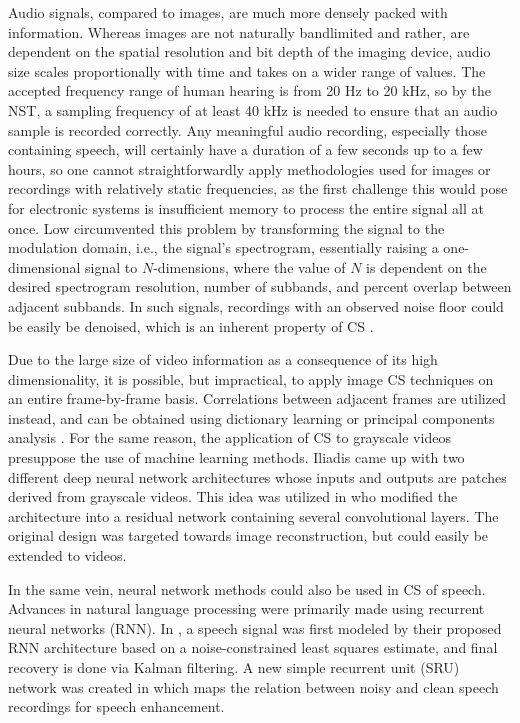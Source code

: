 Audio signals, compared to images, are much more densely packed with information. Whereas images are not naturally bandlimited and rather, are dependent on the spatial resolution and bit depth of the imaging device, audio size scales proportionally with time and takes on a wider range of values. The accepted frequency range of human hearing is from 20 Hz to 20 kHz, so by the NST, a sampling frequency of at least 40 kHz is needed to ensure that an audio sample is recorded correctly. Any meaningful audio recording, especially those containing speech, will certainly have a duration of a few seconds up to a few hours, so one cannot straightforwardly apply methodologies used for images or recordings with relatively static frequencies, as the first challenge this would pose for electronic systems is insufficient memory to process the entire signal all at once. Low \cite{Low2013,Low2018} circumvented this problem by transforming the signal to the modulation domain, i.e., the signal's spectrogram, essentially raising a one-dimensional signal to $N$-dimensions, where the value of $N$ is dependent on the desired spectrogram resolution, number of subbands, and percent overlap between adjacent subbands. In such signals, recordings with an observed noise floor could be easily be denoised, which is an inherent property of CS \cite{Dabov2007}.

Due to the large size of video information as a consequence of its high dimensionality, it is possible, but impractical, to apply image CS techniques on an entire frame-by-frame basis. Correlations between adjacent frames are utilized instead, and can be obtained using dictionary learning \cite{Liu2013} or principal components analysis \cite{Liu2014}. For the same reason, the application of CS to grayscale videos presuppose the use of machine learning methods. Iliadis \cite{Iliadis2018,Iliadis2020} came up with two different deep neural network architectures whose inputs and outputs are patches derived from grayscale videos. This idea was utilized in \cite{Yao2019} who modified the architecture into a residual network containing several convolutional layers. The original design was targeted towards image reconstruction, but could easily be extended to videos.

In the same vein, neural network methods could also be used in CS of speech. Advances in natural language processing were primarily made using recurrent neural networks (RNN). In \cite{Xia2015}, a speech signal was first modeled by their proposed RNN architecture based on a noise-constrained least squares estimate, and final recovery is done via Kalman filtering. A new simple recurrent unit (SRU) network was created in \cite{Cui2020} which maps the relation between noisy and clean speech recordings for speech enhancement.


